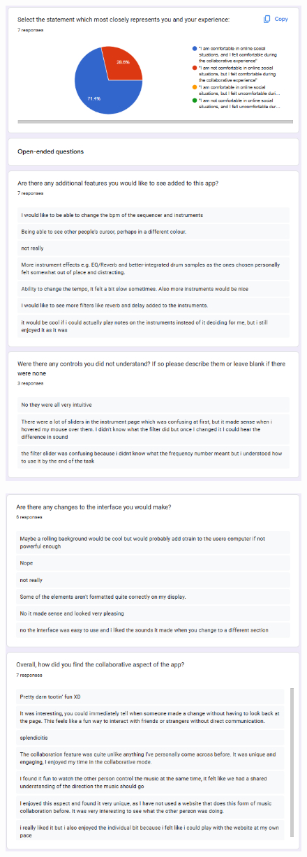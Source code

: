\begin{appendices}
\begin{figure}[htb]
    \includegraphics[width=0.8\linewidth]{images/survey-results/10.png}    
\end{figure}\begin{figure}[htb]
    \centering
    \includegraphics[width=0.8\linewidth]{images/survey-results/11.png}    
\end{figure}


\end{appendices}
